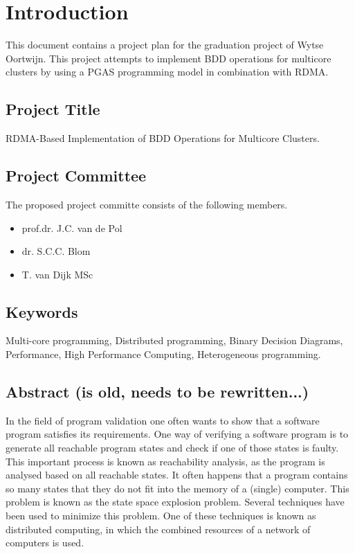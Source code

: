 \chapter{Introduction}
This document contains a project plan for the graduation project of Wytse Oortwijn. This project attempts to implement BDD operations for multicore clusters by using a PGAS programming model in combination with RDMA. 

\section{Project Title}
RDMA-Based Implementation of BDD Operations for Multicore Clusters.

\section{Project Committee}
The proposed project committe consists of the following members.
\begin{itemize}
	\item prof.dr. J.C. van de Pol
	\item dr. S.C.C. Blom
	\item T. van Dijk MSc
\end{itemize}

\section{Keywords}
Multi-core programming, Distributed programming, Binary Decision Diagrams, Performance, High Performance Computing, Heterogeneous programming.

\section{Abstract (is old, needs to be rewritten...)}
In the field of program validation one often wants to show that a software program satisfies its requirements. One way of verifying a software program is to generate all reachable program states and check if one of those states is faulty. This important process is known as reachability analysis, as the program is analysed based on all reachable states. It often happens that a program contains so many states that they do not fit into the memory of a (single) computer. This problem is known as the state space explosion problem. Several techniques have been used to minimize this problem. One of these techniques is known as distributed computing, in which the combined resources of a network of computers is used.

